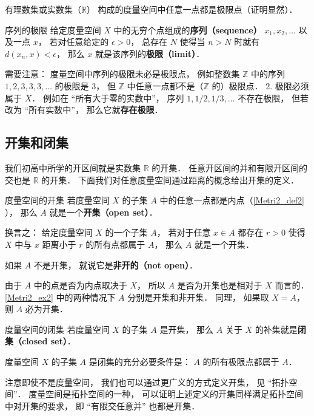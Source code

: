 \begin{example}{}\label{Metri2_ex2}
有理数集或实数集（$\mathbb R$） 构成的度量空间中任意一点都是极限点（证明显然）．
\end{example}

\begin{definition}{序列的极限}\label{Metri2_def1}
给定度量空间 $X$ 中的无穷个点组成的\textbf{序列（sequence）} $x_1, x_2, \dots$ 以及一点 $x$， 若对任意给定的 $\epsilon > 0$， 总存在 $N$ 使得当 $n > N$ 时就有 $d(x_n, x) < \epsilon$， 那么 $x$ 就是该序列的\textbf{极限（limit）}．
\end{definition}
需要注意： 度量空间中序列的极限未必是极限点， 例如整数集 $\mathbb Z$ 中的序列 $1, 2, 3, 3, 3, \dots$ 的极限是 $3$， 但 $\mathbb Z$ 中任意一点都不是（$\mathbb Z$ 的）极限点． 2. 极限必须属于 $X$． 例如在 “所有大于零的实数中”， 序列 $1, 1/2, 1/3, \dots$ 不存在极限， 但若改为 “所有实数中”， 那么它就\textbf{存在极限}．


\subsection{开集和闭集}
我们初高中所学的开区间就是实数集 $\mathbb R$ 的开集． 任意开区间的并和有限开区间的交也是 $\mathbb R$ 的开集． 下面我们对任意度量空间通过距离的概念给出开集的定义．

\begin{definition}{度量空间的开集}
若度量空间 $X$ 的子集 $A$ 中的任意一点都是内点（\autoref{Metri2_def2} ）， 那么 $A$ 就是一个\textbf{开集（open set）}．

换言之： 给定度量空间 $X$ 的一个子集 $A$， 若对于任意 $x \in A$ 都存在 $r > 0$ 使得 $X$ 中与 $x$ 距离小于 $r$ 的所有点都属于 $A$， 那么 $A$ 就是一个开集．

如果 $A$ 不是开集， 就说它是\textbf{非开的（not open）}．
\end{definition}
由于 $A$ 中的点是否为内点取决于 $X$， 所以 $A$ 是否为开集也是相对于 $X$ 而言的． \autoref{Metri2_ex2} 中的两种情况下 $A$ 分别是开集和非开集． 同理， 如果取 $X = A$， 则 $A$ 必为开集．

\begin{definition}{度量空间的闭集}
若度量空间 $X$ 的子集 $A$ 是开集， 那么 $A$ 关于 $X$ 的补集就是\textbf{闭集（closed set）}．
\end{definition}

\begin{theorem}{}
度量空间 $X$ 的子集 $A$ 是闭集的充分必要条件是： $A$ 的所有极限点都属于 $A$．
\end{theorem}

注意即使不是度量空间， 我们也可以通过更广义的方式定义开集， 见 “拓扑空间”． 度量空间是拓扑空间的一种， 可以证明上述定义的开集同样满足拓扑空间中对开集的要求， 即 “有限交任意并” 也都是开集．

